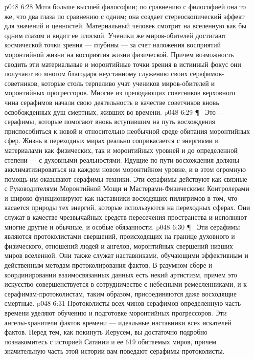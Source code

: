 \vs p048 6:28 Мота больше высшей философии; по сравнению с философией она то же, что два глаза по сравнению с одним; она создает стереоскопический эффект для значений и ценностей. Материальный человек смотрит на вселенную как бы одним глазом и видит ее плоской. Ученики же миров\hyp{}обителей достигают космической точки зрения --- глубины --- за счет наложения восприятий моронтийной жизни на восприятия жизни физической. Причем возможность сводить эти материальные и моронтийные точки зрения в истинный фокус они получают во многом благодаря неустанному служению своих серафимов\hyp{}советников, которые столь терпеливо учат учеников миров\hyp{}обителей и моронтийных прогрессоров. Многие из преподающих советников верховного чина серафимов начали свою деятельность в качестве советчиков вновь освобожденных душ смертных, живших во времени.
\vs p048 6:29 \P\ \bibnobreakspace {} Это --- серафимы, которые помогают вновь вступившим на путь восхождения приспособиться к новой и относительно необычной среде обитания моронтийных сфер. Жизнь в переходных мирах реально соприкасается с энергиями и материалами как физических, так и моронтийных уровней и до определенной степени --- с духовными реальностями. Идущие по пути восхождения должны акклиматизироваться на каждом новом моронтийном уровне, и в этом огромную помощь им оказывают серафимы\hyp{}техники. Эти серафимы действуют как связные с Руководителями Моронтийной Мощи и Мастерами\hyp{}Физическими Контролерами и широко функционируют как наставники восходящих пилигримов в том, что касается природы тех энергий, которые используются на переходных сферах. Они служат в качестве чрезвычайных средств пересечения пространства и исполняют многие другие и обычные, и особые обязанности.
\vs p048 6:30 \P\ \bibnobreakspace {} Эти серафимы являются протоколистами свершений, происходящих на границе духовного и физического, отношений людей и ангелов, моронтийных свершений низших миров вселенной. Они также служат наставниками, обучающими эффективным и действенным методам протоколирования фактов. В разумном сборе и координировании взаимосвязанных данных есть некий артистизм, причем это искусство совершенствуется в сотрудничестве с небесными ремесленниками, и к серафимам\hyp{}протоколистам, таким образом, присоединяются даже восходящие смертные.
\vs p048 6:31 Протоколисты всех чинов серафимов определенную часть времени уделяют обучению и подготовке моронтийных прогрессоров. Эти ангелы\hyp{}хранители фактов времени --- идеальные наставники всех искателей фактов. Перед тем, как покинуть Иерусем, вы достаточно подробно познакомитесь с историей Сатании и ее 619 обитаемых миров, причем значительную часть этой истории вам поведают серафимы\hyp{}протоколисты.
